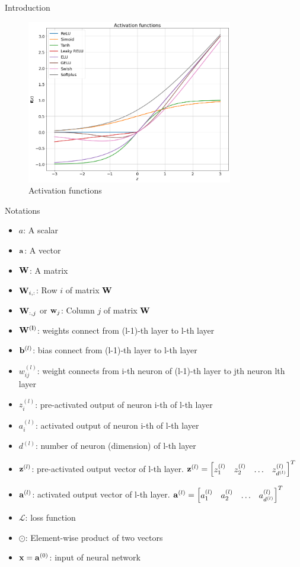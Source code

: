 \documentclass[10pt]{beamer}
\theoremstyle{remark}
\theoremstyle{definition}
\begin{document}
\begin{frame}[allowframebreaks]{Introduction}
	\begin{figure}
		\centering
		\includegraphics[width=9cm]{activation_functions.png}
		\caption{Activation functions}
	\end{figure}
\end{frame}

\begin{frame}[allowframebreaks]{Notations}
	\begin{itemize}
		\item $a$: A scalar
  		\item $\bold{a}$: A vector
    	\item $\bold{W}$: A matrix
     	\item $\bold{W}_{i,:}$: Row $i$ of matrix $\bold{W}$
      	\item $\bold{W}_{:,j}$ or $\bold{w}_j$: Column $j$ of matrix $\bold{W}$
       	\item $\bold{W^{(l)}}$: weights connect from (l-1)-th layer to l-th layer
        \item $\bold{b}^{(l)}$: bias connect from (l-1)-th layer to l-th layer
        \item $w_{ij}^{(l)}$: weight connects from i-th neuron of (l-1)-th layer to jth neuron lth layer
        \item $z_{i}^{(l)}$: pre-activated output of neuron i-th of l-th layer
        \item $a_{i}^{(l)}$: activated output of neuron i-th of l-th layer
        \item $d^{(l)}$: number of neuron (dimension) of l-th layer
        \item $\bold{z}^{(l)}$: pre-activated output vector of l-th layer. $\bold{z}^{(l)} = \begin{bmatrix} z_1^{(l)} & z_2^{(l)} & \dots & z_{d^{(l)}}^{(l)}\end{bmatrix}^T$
        \item $\bold{a}^{(l)}$: activated output vector of l-th layer. $\bold{a}^{(l)} = \begin{bmatrix} a_1^{(l)} & a_2^{(l)} &\dots & a_{d^{(l)}}^{(l)}\end{bmatrix}^T$
        \item $\mathcal{L}$: loss function
        \item $\odot$: Element-wise product of two vectors
        \item $\bold{x}=\bold{a}^{(0)}$: input of neural network
	\end{itemize}

\end{frame}
\end{document}
